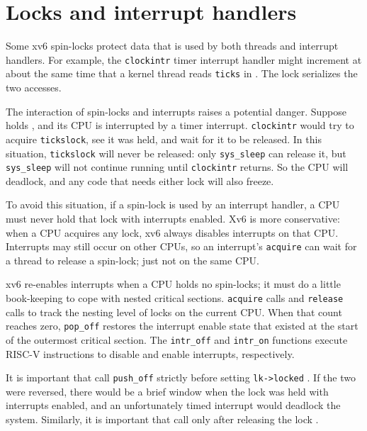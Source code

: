 \section{Locks and interrupt handlers}

Some xv6 spin-locks protect data that is used by
both threads and interrupt handlers.
For example, the
\lstinline{clockintr}
timer interrupt handler might increment
at about the same time that a kernel
thread reads
\lstinline{ticks} 
in
.
The lock
serializes the two accesses.

The interaction of spin-locks and interrupts raises a potential danger.
Suppose
holds
,
and its CPU is interrupted by a timer interrupt.
\lstinline{clockintr}
would try to acquire
\lstinline{tickslock},
see it was held, and wait for it to be released.
In this situation,
\lstinline{tickslock}
will never be released: only
\lstinline{sys_sleep}
can release it, but
\lstinline{sys_sleep}
will not continue running until
\lstinline{clockintr}
returns.
So the CPU will deadlock, and any code
that needs either lock will also freeze.

To avoid this situation, if a spin-lock is used by an interrupt handler,
a CPU must never hold that lock with interrupts enabled.
Xv6 is more conservative: when a CPU acquires any
lock, xv6 always disables interrupts on that CPU.
Interrupts may still occur on other CPUs, so 
an interrupt's
\lstinline{acquire}
can wait for a thread to release a spin-lock; just not on the same CPU.

xv6 re-enables interrupts when a CPU holds no spin-locks; it must
do a little book-keeping to cope with nested critical sections.
\lstinline{acquire}
calls
and
\lstinline{release}
calls
to track the nesting level of locks on the current CPU.
When that count reaches zero,
\lstinline{pop_off} 
restores the interrupt enable state that existed 
at the start of the outermost critical section.
The
\lstinline{intr_off}
and
\lstinline{intr_on}
functions execute RISC-V instructions to disable and enable
interrupts, respectively.

It is important that
call
\lstinline{push_off}
strictly before setting
\lstinline{lk->locked}
.
If the two were reversed, there would be
a brief window when the lock
was held with interrupts enabled, and
an unfortunately timed interrupt would deadlock the system.
Similarly, it is important that
call
only after 
releasing the lock
.

